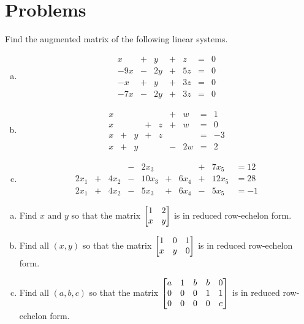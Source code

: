 \section*{Problems}




\begin{prob} \label{prob11.1} Find the augmented matrix of the following linear systems.
\medskip
\begin{enumerate}[a)]
\item 
$$\begin{matrix}
x&+&y&+&z&=&0\\
-9x&-&2y&+&5z&=&0\\
-x&+&y&+&3z&=&0\\
-7x&-&2y&+&3z&=&0 \end{matrix} $$
\medskip
%

\item\sov $$\begin{matrix} x&&&&&+&w&=&1\\
x&&&+&z&+&w&=&0\\
x&+&y&+&z&&&=&-3\\
x&+&y&&&-&2w&=&2 \end{matrix} $$
\medskip
% 
\item 
$$\begin{matrix} &&&-&2x_{3}&&&+&7x_{5}&=12\\
2x_{1}&+&4x_{2}&-&10x_{3}&+&6x_{4}&+&12x_{5}&=28\\
2x_{1}&+&4x_{2}&-&5x_{3}&+&6x_{4}&-&5x_{5}&=-1\end{matrix}$$
\medskip
%
\end{enumerate}
\end{prob} \begin{prob} \label{prob11.2}
\medskip
\begin{enumerate}[a)]
\item Find $x$ and $y$ so that the matrix $\bmatrix 1&2\cr
x&y \endbmatrix$ is in reduced row-echelon form.
\medskip
%
\item\sov Find all $(x,y)$ so that the matrix $\bmatrix 1&0&1\cr
x&y&0\endbmatrix$ is in reduced row-echelon form.
\medskip
%
\item  Find all $(a,  b,  c)$ so that the matrix
$\bmatrix a&1&b&b&0\cr 0&0&0&1&1\cr 0&0&0&0&c\endbmatrix$ is in
reduced row-echelon form.
\medskip
%
\end{enumerate}

\end{prob}